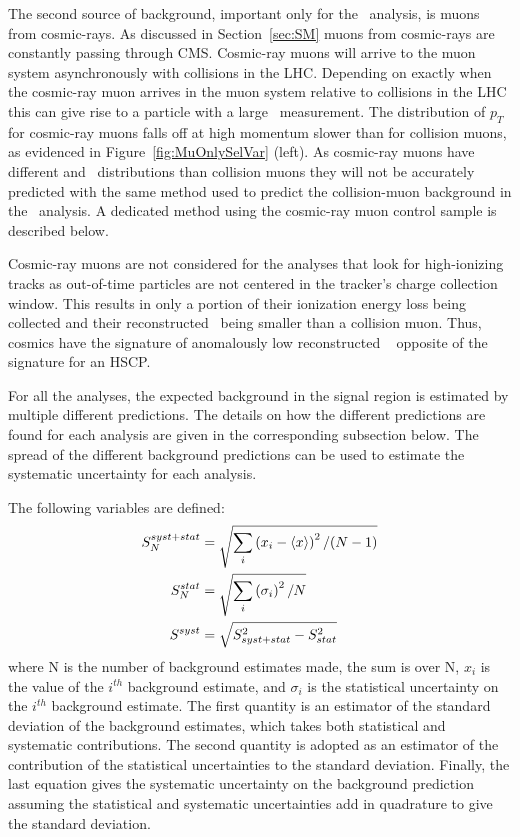 The second source of background, important only for the \muononly\  analysis,
is muons from cosmic-rays. 
As discussed in Section~\ref{sec:SM} muons from cosmic-rays
are constantly passing through CMS. Cosmic-ray muons will arrive to the muon system asynchronously with collisions in the LHC. Depending on exactly
when the cosmic-ray muon arrives in the muon system relative to collisions in the LHC this can give rise to a particle with a large \invbeta\ measurement.
The distribution of $p_T$ for cosmic-ray muons falls off at high momentum slower than for collision muons, as evidenced in Figure~\ref{fig:MuOnlySelVar} (left).
As cosmic-ray muons have different \invbeta and \pt\ distributions than collision muons they will not be accurately predicted with the same method used to predict
the collision-muon background in the \muononly\ analysis. A dedicated method using the cosmic-ray muon control sample is described below.

Cosmic-ray muons are not considered for the analyses that look for high-ionizing tracks as
out-of-time particles are not centered in the tracker's charge collection window.
This results in only a portion of their ionization energy loss being collected and their reconstructed \dedx\ being smaller than a collision muon.
Thus, cosmics have the signature of anomalously low reconstructed \dedx~\cite{CMS:2012xi} opposite of the signature for an HSCP.

For all the analyses, the expected background in the signal region is estimated by multiple different predictions.
The details on how the different predictions are found for each analysis are given in the corresponding subsection below.
The spread of the different background predictions can be used to estimate the systematic uncertainty for each analysis.

The following variables are defined:
\begin{equation}
\centering
\begin{split}
S^{syst+stat}_{N} &= \sqrt{\sum_i \left( x_i - \langle x \rangle  \right) ^2/(N-1)} \\
S^{stat}_{N} &= \sqrt{\sum_i \left( \sigma _i \right) ^2/N} \\
S^{syst} &= \sqrt{S_{syst+stat}^2-S_{stat}^2} \\
\end{split}
\label{eq:variance}
\end{equation}
where N is the number of background estimates made,
the sum is over N, $x_i$ is the value of the $i^{th}$ background estimate,
and $\sigma_i$ is the statistical uncertainty on
the $i^{th}$ background estimate. The first quantity is an estimator of the
standard deviation of the background estimates, which takes both statistical
and systematic contributions. The second quantity is adopted as an
estimator of the contribution of the statistical uncertainties
to the standard deviation. Finally, the last equation gives the systematic uncertainty on the background prediction assuming
the statistical and systematic uncertainties add in quadrature to give the standard deviation.

